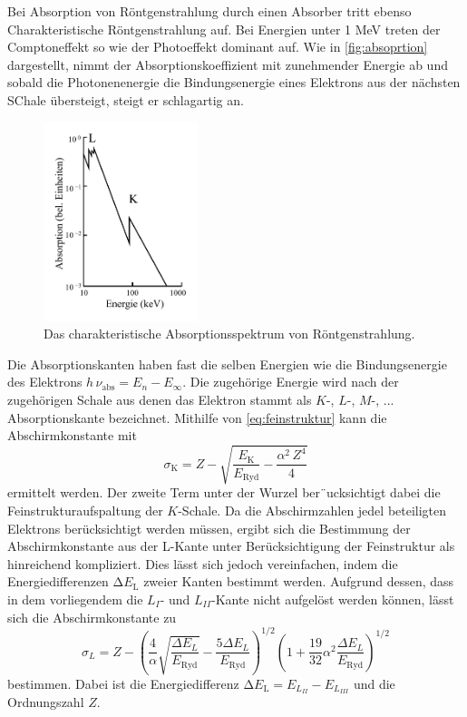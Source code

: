 Bei Absorption von Röntgenstrahlung durch einen Absorber tritt ebenso Charakteristische Röntgenstrahlung auf.
Bei Energien unter 1 MeV treten der Comptoneffekt so wie der Photoeffekt dominant auf. 
Wie in \autoref{fig:absoprtion} dargestellt, nimmt der Absorptionskoeffizient mit zunehmender Energie ab 
und sobald die Photonenenergie die Bindungsenergie eines Elektrons aus der nächsten SChale übersteigt, steigt er schlagartig an.
\begin{figure}[H]
    \centering
    \includegraphics[width=0.4\textwidth]{pictures/absorption.pdf}
    \caption{Das charakteristische Absorptionsspektrum von Röntgenstrahlung. \cite{v602}}
    \label{fig:absoprtion}
\end{figure}
Die Absorptionskanten haben fast die selben Energien wie die Bindungsenergie des Elektrons $h \, \nu_\text{abs} = E_n - E_{\infty}$.
Die zugehörige Energie wird nach der zugehörigen Schale aus denen das Elektron stammt als $K$-, $L$-, $M$-, ... Absorptionskante bezeichnet.
Mithilfe von \autoref{eq:feinstruktur} kann die Abschirmkonstante mit 
\begin{equation}
    \sigma_{\mathrm{K}}=Z-\sqrt{\frac{E_{\mathrm{K}}}{E_\text{Ryd}}-\frac{\alpha^{2} \, Z^{4}}{4}}
\end{equation}
ermittelt werden.
Der zweite Term unter der Wurzel ber¨ucksichtigt dabei die Feinstrukturaufspaltung der $K$-Schale.
Da die Abschirmzahlen jedel beteiligten Elektrons berücksichtigt werden müssen, 
ergibt sich die Bestimmung der Abschirmkonstante aus der L-Kante unter Berücksichtigung der Feinstruktur als hinreichend kompliziert.
Dies lässt sich jedoch vereinfachen, indem die Energiedifferenzen $\increment E_\text{L}$ zweier Kanten bestimmt werden.
Aufgrund dessen, dass in dem vorliegendem die $L_{I}$- und $L_{II}$-Kante nicht aufgelöst werden können, 
lässt sich die Abschirmkonstante zu 
\begin{equation}
    \sigma_{L}=Z-\left(\frac{4}{\alpha} \sqrt{\frac{\Delta E_{L}}{E_\text{Ryd}}}-\frac{5 \Delta E_{L}}{E_\text{Ryd}}\right)^{1 / 2}\left(1+\frac{19}{32} \alpha^{2} \frac{\Delta E_{L}}{E_\text{Ryd}}\right)^{1 / 2}
\end{equation}
bestimmen. 
Dabei ist die Energiedifferenz $\increment E_\text{L} = E_{L_{II}} - E_{L_{III}}$ und die Ordnungszahl $Z$.

